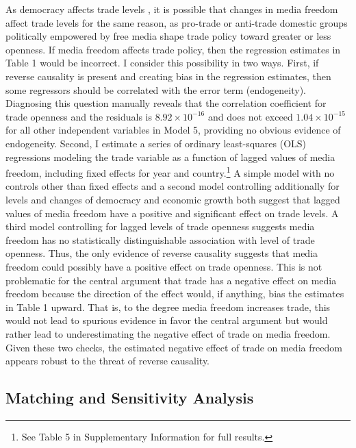 \documentclass[12pt,a4paper]{article}\usepackage[]{graphicx}\usepackage[]{color}
\begin{document}
As democracy affects trade levels \parencite{Milner:2005ci}, it is possible that changes in media freedom affect trade levels for the same reason, as pro-trade or anti-trade domestic groups politically empowered by free media shape trade policy toward greater or less openness. If media freedom affects trade policy, then the regression estimates in Table 1 would be incorrect. I consider this possibility in two ways. First, if reverse causality is present and creating bias in the regression estimates, then some regressors should be correlated with the error term (endogeneity). Diagnosing this question manually reveals that the correlation coefficient for trade openness and the residuals is \ensuremath{8.92\times 10^{-16}} and does not exceed \ensuremath{1.04\times 10^{-15}} for all other independent variables in Model 5, providing no obvious evidence of endogeneity. Second, I estimate a series of ordinary least-squares (OLS) regressions modeling the trade variable as a function of lagged values of media freedom, including fixed effects for year and country.\footnote{See Table 5 in Supplementary Information for full results.} A simple model with no controls other than fixed effects and a second model controlling additionally for levels and changes of democracy and economic growth both suggest that lagged values of media freedom have a positive and significant effect on trade levels. A third model controlling for lagged levels of trade openness suggests media freedom has no statistically distinguishable association with level of trade openness. Thus, the only evidence of reverse causality suggests that media freedom could possibly have a positive effect on trade openness. This is not problematic for the central argument that trade has a negative effect on media freedom because the direction of the effect would, if anything, bias the estimates in Table 1 upward. That is, to the degree media freedom increases trade, this would not lead to spurious evidence in favor the central argument but would rather lead to underestimating the negative effect of trade on media freedom. Given these two checks, the estimated negative effect of trade on media freedom appears robust to the threat of reverse causality.

\subsection{Matching and Sensitivity Analysis}
\end{document}

